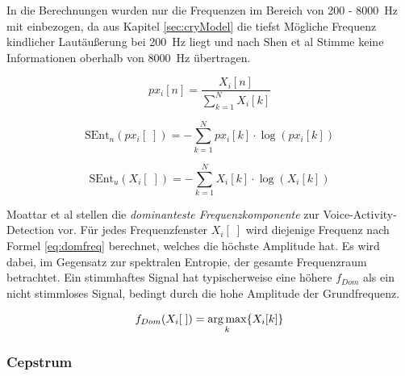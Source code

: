 In die Berechnungen wurden nur die Frequenzen im Bereich von 200 - \SI{8000}{\hertz} mit einbezogen, da aus Kapitel \ref{sec:cryModel} die tiefst Mögliche Frequenz kindlicher Lautäußerung bei \SI{200}{\hertz} liegt und nach Shen et al \cite{vad_entropie02} Stimme keine Informationen oberhalb von \SI{8000}{\hertz} übertragen.

\begin{equation}
px_i[n] = \frac{X_i[n]}{\sum_{k=1}^{N} X_i[k]}
\label{eq:norm_spek}
\end{equation}

\begin{equation}
\text{SEnt}_n(px_i[\;]) = -\sum_{k=1}^{N}px_i[k] \cdot\log(px_i[k])
\label{eq:norm_se}
\end{equation}

\begin{equation}
\text{SEnt}_u(X_i[\;]) = -\sum_{k=1}^{N}X_i[k] \cdot\log(X_i[k])
\label{eq:unnnorm_se}
\end{equation}

Moattar et al \cite[S. 2550]{vad_Easy} stellen die \emph{dominanteste Frequenzkomponente} zur Voice-Activity-Detection vor. Für jedes Frequenzfenster $X_i[\;]$ wird diejenige Frequenz nach Formel \ref{eq:domfreq} berechnet, welches die höchste Amplitude hat. Es wird dabei, im Gegensatz zur spektralen Entropie, der gesamte Frequenzraum betrachtet. Ein stimmhaftes Signal hat typischerweise eine höhere $f_{Dom}$ als ein nicht stimmloses Signal, bedingt durch die hohe Amplitude der Grundfrequenz.

\begin{equation}
f_{Dom}(X_i[\;]) = \operatorname*{arg\,max}_k\{X_i[k]\}
\label{eq:domfreq}
\end{equation}



\subsubsection{Cepstrum}
\label{sec:cepstrum-feature}

